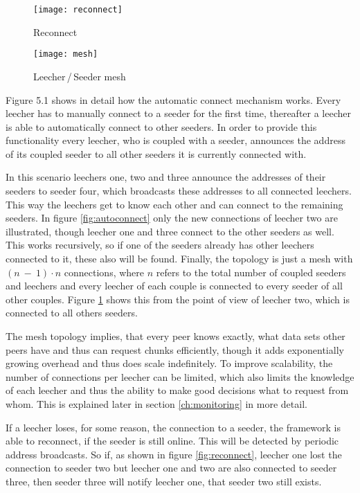 \begin{figure} [ht]
	\centering
	\begin{minipage}[b]{0.6\linewidth}
		\texttt{[image: reconnect]}
		\caption{Reconnect}
		\label{fig:reconnect}
	\end{minipage}
	\hspace{0.1\linewidth}
	\begin{minipage}[b]{0.25\linewidth}
		\texttt{[image: mesh]}
		\caption{Leecher\,/\,Seeder mesh}
		\label{fig:mesh}
	\end{minipage}
\end{figure}

Figure 5.1 shows in detail how the automatic connect mechanism works. Every leecher has to manually connect to a seeder for the first time, thereafter a leecher is able to automatically connect to other seeders. In order to provide this functionality every leecher, who is coupled with a seeder, announces the address of its coupled seeder to all other seeders it is currently connected with.

In this scenario leechers one, two and three announce the addresses of their seeders to seeder four, which broadcasts these addresses to all connected leechers. This way the leechers get to know each other and can connect to the remaining seeders. In figure \ref{fig:autoconnect} only the new connections of leecher two are illustrated, though leecher one and three connect to the other seeders as well. This works recursively, so if one of the seeders already has other leechers connected to it, these also will be found. Finally, the topology is just a mesh with $(n\:-\:1)\cdot n$ connections, where $n$ refers to the total number of coupled seeders and leechers and every leecher of each couple is connected to every seeder of all other couples. Figure \ref{fig:mesh} shows this from the point of view of leecher two, which is connected to all others seeders.

The mesh topology implies, that every peer knows exactly, what data sets other peers have and thus can request chunks efficiently, though it adds exponentially growing overhead and thus does scale indefinitely. To improve scalability, the number of connections per leecher can be limited, which also limits the knowledge of each leecher and thus the ability to make good decisions what to request from whom. This is explained later in section \ref{ch:monitoring} in more detail.

If a leecher loses, for some reason, the connection to a seeder, the framework is able to reconnect, if the seeder is still online. This will be detected by periodic address broadcasts. So if, as shown in figure \ref{fig:reconnect}, leecher one lost the connection to seeder two but leecher one and two are also connected to seeder three, then seeder three will notify leecher one, that seeder two still exists.


